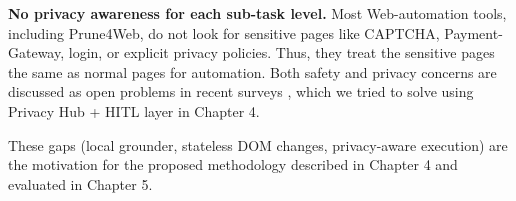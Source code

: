 \textbf{No privacy awareness for each sub-task level.}
Most Web-automation tools, including Prune4Web, do not look for sensitive pages like CAPTCHA, Payment-Gateway, login, or explicit privacy policies. Thus, they treat the sensitive pages the same as normal pages for automation. Both safety and privacy concerns are discussed as open problems in recent surveys \cite{tang2025surveymllmbasedguiagents} \cite{ning2025surveywebagentsnextgenerationai}, which we tried to solve using Privacy Hub + HITL layer in Chapter 4.

\bigskip
\noindent These gaps (local grounder, stateless DOM changes, privacy-aware execution) are the motivation for the proposed methodology described in Chapter 4 and evaluated in Chapter 5.

